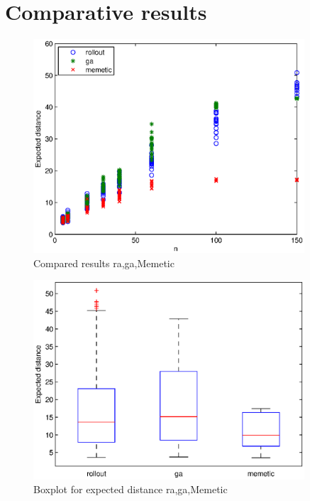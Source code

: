 

\section{Comparative results}

\begin{figure}[!htbp]
  \begin{center}
   \includegraphics[width=0.9\textwidth]{Images/Chapter5/comparative_results.eps}
  \end{center}
    \caption{Compared results ra,ga,Memetic}\label{fig:comparative_results}
\end{figure}

\begin{figure}[!htbp]
  \begin{center}
   \includegraphics[width=0.9\textwidth]{Images/Chapter5/comparative_results_box.eps}
  \end{center}
    \caption{Boxplot for expected distance ra,ga,Memetic}\label{fig:comparative_results_box}
\end{figure}



